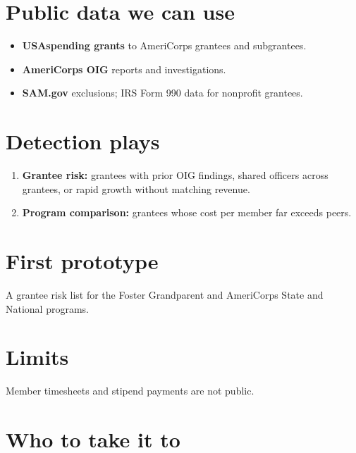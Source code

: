 \documentclass[letterpaper,11pt]{article}
\providecommand{\tightlist}{\setlength{\itemsep}{0pt}\setlength{\parskip}{0pt}}
\begin{document}
\hypertarget{public-data-we-can-use}{%
\section{Public data we can use}\label{public-data-we-can-use}}

\begin{itemize}
\tightlist
\item
  \textbf{USAspending grants} to AmeriCorps grantees and subgrantees.
\item
  \textbf{AmeriCorps OIG} reports and investigations.
\item
  \textbf{SAM.gov} exclusions; IRS Form 990 data for nonprofit grantees.
\end{itemize}

\hypertarget{detection-plays}{%
\section{Detection plays}\label{detection-plays}}

\begin{enumerate}
\def\labelenumi{\arabic{enumi}.}
\tightlist
\item
  \textbf{Grantee risk:} grantees with prior OIG findings, shared
  officers across grantees, or rapid growth without matching revenue.
\item
  \textbf{Program comparison:} grantees whose cost per member far
  exceeds peers.
\end{enumerate}

\hypertarget{first-prototype}{%
\section{First prototype}\label{first-prototype}}

A grantee risk list for the Foster Grandparent and AmeriCorps State and
National programs.

\hypertarget{limits}{%
\section{Limits}\label{limits}}

Member timesheets and stipend payments are not public.

\hypertarget{who-to-take-it-to}{%
\section{Who to take it to}\label{who-to-take-it-to}}
\end{document}
